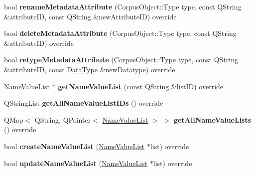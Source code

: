 \begin{DoxyCompactItemize}
bool {\bfseries rename\+Metadata\+Attribute} (Corpus\+Object\+::\+Type type, const Q\+String \&attribute\+ID, const Q\+String \&new\+Attribute\+ID) override
\item 
\mbox{\label{class_x_m_l_metadata_datastore_a878c2a1e64de8e35f09893e004c43c05}} 
bool {\bfseries delete\+Metadata\+Attribute} (Corpus\+Object\+::\+Type type, const Q\+String \&attribute\+ID) override
\item 
\mbox{\label{class_x_m_l_metadata_datastore_ac3474342ea8fdf13ec0c3847f4c1dd54}} 
bool {\bfseries retype\+Metadata\+Attribute} (Corpus\+Object\+::\+Type type, const Q\+String \&attribute\+ID, const \hyperlink{class_data_type}{Data\+Type} \&new\+Datatype) override
\item 
\mbox{\label{class_x_m_l_metadata_datastore_a365d65f22d0b3c61aeb9c0c3fc9f3ced}} 
\hyperlink{class_name_value_list}{Name\+Value\+List} $\ast$ {\bfseries get\+Name\+Value\+List} (const Q\+String \&list\+ID) override
\item 
\mbox{\label{class_x_m_l_metadata_datastore_a9009225eb3818379122aa5ff984887ac}} 
Q\+String\+List {\bfseries get\+All\+Name\+Value\+List\+I\+Ds} () override
\item 
\mbox{\label{class_x_m_l_metadata_datastore_a3e9c9f066303703a284583122ed680cc}} 
Q\+Map$<$ Q\+String, Q\+Pointer$<$ \hyperlink{class_name_value_list}{Name\+Value\+List} $>$ $>$ {\bfseries get\+All\+Name\+Value\+Lists} () override
\item 
\mbox{\label{class_x_m_l_metadata_datastore_a8f7162d6357b82d8b41e27a452695142}} 
bool {\bfseries create\+Name\+Value\+List} (\hyperlink{class_name_value_list}{Name\+Value\+List} $\ast$list) override
\item 
\mbox{\label{class_x_m_l_metadata_datastore_af276388acdfff0aa6923ad89c8eb0469}} 
bool {\bfseries update\+Name\+Value\+List} (\hyperlink{class_name_value_list}{Name\+Value\+List} $\ast$list) override
\item 
\mbox{\label{class_x_m_l_metadata_datastore_aa249725510e6c454986e84abbe3c9af2}} 

\end{DoxyCompactItemize}

